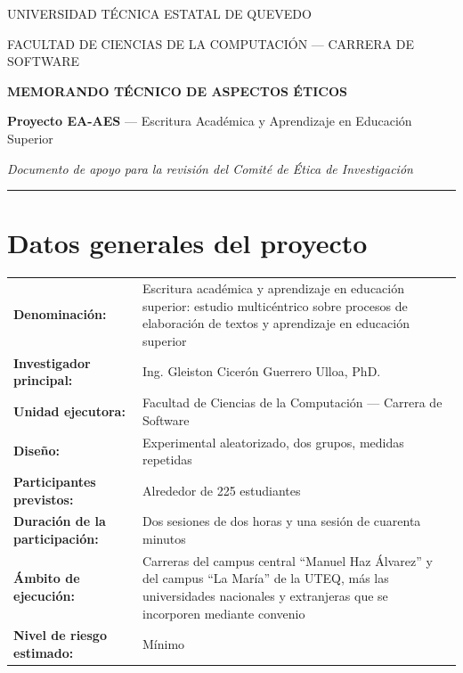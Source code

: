 \documentclass[11pt,a4paper]{article}
\begin{document}
\begin{center}
	{\sffamily\small\color{grismedio} UNIVERSIDAD T\'ECNICA ESTATAL DE QUEVEDO\par}
	{\sffamily\small\color{grismedio} FACULTAD DE CIENCIAS DE LA COMPUTACI\'ON --- CARRERA DE SOFTWARE\par}
	\vspace{8pt}
	{\sffamily\large\bfseries\color{azulinstitucional} MEMORANDO T\'ECNICO DE ASPECTOS \'ETICOS\par}
	\vspace{3pt}
	{\sffamily\small\textbf{Proyecto EA-AES} --- Escritura Acad\'emica y Aprendizaje en Educaci\'on Superior\par}
	\vspace{2pt}
	{\footnotesize\itshape Documento de apoyo para la revisi\'on del Comit\'e de \'Etica de Investigaci\'on\par}
\end{center}

\vspace{4pt}
\hrule
\vspace{6pt}

\section{Datos generales del proyecto}

\begin{tabular}{@{}L{5.0cm}@{}L{10.4cm}@{}}
	\textbf{\small Denominaci\'on:} & Escritura acad\'emica y aprendizaje en educación superior: estudio multic\'entrico sobre procesos de elaboraci\'on de textos y aprendizaje en educaci\'on superior \\
	\textbf{\small Investigador principal:} & Ing. Gleiston Cicer\'on Guerrero Ulloa, PhD. \\
	\textbf{\small Unidad ejecutora:} & Facultad de Ciencias de la Computaci\'on --- Carrera de Software \\
	\textbf{\small Dise\~no:} & Experimental aleatorizado, dos grupos, medidas repetidas \\
	\textbf{\small Participantes previstos:} & Alrededor de 225 estudiantes \\
	\textbf{\small Duraci\'on de la participaci\'on:} & Dos sesiones de dos horas y una sesi\'on de cuarenta minutos \\
	\textbf{\small \'Ambito de ejecuci\'on:} & Carreras del campus central ``Manuel Haz \'Alvarez'' y del campus ``La Mar\'ia'' de la UTEQ, m\'as las universidades nacionales y extranjeras que se incorporen mediante convenio \\
	\textbf{\small Nivel de riesgo estimado:} & M\'inimo \\
\end{tabular}
\end{document}
